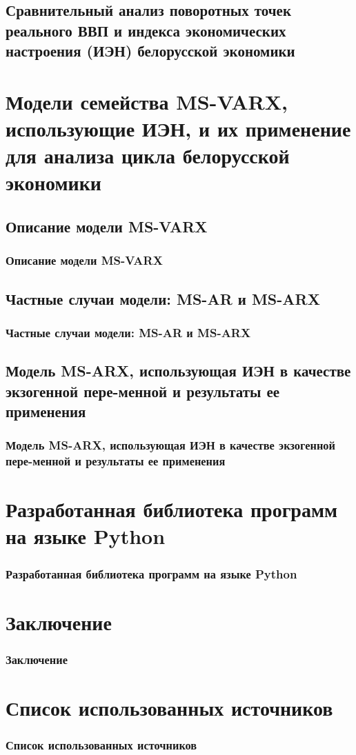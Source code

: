 \documentclass{beamer}
\begin{document}
		\subsection{Сравнительный анализ поворотных точек реального ВВП и индекса экономических настроения (ИЭН) белорусской экономики}
		
	\section{Модели семейства MS-VARX, использующие ИЭН, и их применение для анализа цикла белорусской экономики}
		\subsection{Описание модели MS-VARX}
		\begin{frame}
			\frametitle{Описание модели MS-VARX}
			
			
		\end{frame}


		\subsection{Частные случаи модели: MS-AR  и MS-ARX }
		\begin{frame}
			\frametitle{Частные случаи модели: MS-AR  и MS-ARX }
			
			
		\end{frame}


		
		\subsection{Модель MS-ARX, использующая ИЭН в качестве экзогенной пере-менной  и результаты ее применения }
		\begin{frame}
			\frametitle{Модель MS-ARX, использующая ИЭН в качестве экзогенной пере-менной  и результаты ее применения }
			
		\end{frame}
		
		
		
		
	\section{Разработанная библиотека программ на языке Python}
		\begin{frame}
			\frametitle{Разработанная библиотека программ на языке Python}
			
			
		\end{frame}
		
		
	
	\section*{Заключение}
	\begin{frame}
		\frametitle{Заключение}
	\end{frame}


	\section*{Список использованных источников }
		\begin{frame}
		\frametitle{Список использованных источников }
	\end{frame}
	
\end{document}
